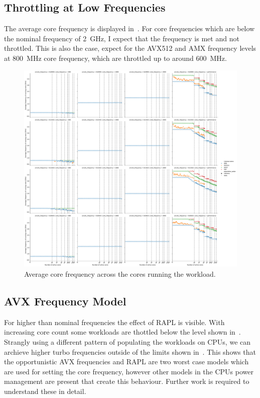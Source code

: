 \subsection{Throttling at Low Frequencies}
\label{sec:avx-anomalies-low-freq}

The average core frequency is displayed in~.
For core frequencies which are below the nominal frequency of \SI{2}{\GHz}, I expect that the frequency is met and not throttled.
This is also the case, expect for the AVX512 and AMX frequency levels at \SI{800}{\MHz} core frequency, which are throttled up to around \SI{600}{\MHz}.

\begin{figure}[]
    \centering
    \includegraphics[width=\columnwidth]{fig/core-power-regulators-core-frequency.pdf}
    \caption{\label{fig:avx-anomaly-core-frequency}Average core frequency across the cores running the workload.}
\end{figure}


\subsection{AVX Frequency Model}
\label{sec:avx-anomalies-model}

For higher than nominal frequencies the effect of RAPL is visible.
With increasing core count some workloads are thottled below the level shown in~.
Strangly using a different pattern of populating the workloads on CPUs, we can archieve higher turbo frequencies outside of the limits shown in~.
This shows that the opportunistic AVX frequencies and RAPL are two worst case models which are used for setting the core frequency, however other models in the CPUs power management are present that create this behaviour.
Further work is required to understand these in detail.

